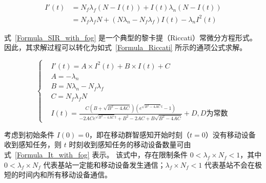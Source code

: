 
\begin{equation}
  \label{Formula_SIR_with_fog}
  \begin{aligned}
    I'(t) &= N_f \lambda_f (N-I(t)) + I(t) \lambda_n (N-I(t)) \\
    &= N_f \lambda_f N + ( N \lambda_n - N_f \lambda_f) I(t) - \lambda_n I^2(t) 
  \end{aligned}
\end{equation}

式~\eqref{Formula_SIR_with_fog} 是一个典型的黎卡提（Riccati）常微分方程形式。
因此，其求解过程可以转化为如式~\eqref{Formula_Riccati} 所示的通项公式求解。

\vspace{-1em}
\begin{equation}
  \label{Formula_Riccati}
  \left\{
    \begin{aligned}
      &I'(t) = A \times I^2(t) + B \times I(t) + C \\
      &A = -\lambda_n \\
      &B = N \lambda_n - N_f \lambda_f \\
      &C = N_f \lambda_f N \\
      &I(t) = \frac{C(B+\sqrt{B^2 - 4AC})(e^{\sqrt{B^2 - 4AC} t} - 1)}{-2ACe^{\sqrt{B^2 - 4AC} t} + B^2 -2AC + B \sqrt{B^2 - 4AC}} + D, D 为常数
    \end{aligned}
  \right.
\end{equation}

考虑到初始条件 $I(0)=0$，即在移动群智感知开始时刻（$t=0$）没有移动设备收到感知任务，则 $t$ 时刻收到感知任务的移动设备数量可由式~\eqref{Formula_It_with_fog} 表示。
该式中，存在限制条件 $0 < \lambda_f \times N_f < 1$，其中 $0 < \lambda_f \times N_f$ 代表基站一定能和移动设备发生通信；$\lambda_f \times N_f < 1$ 代表基站不会在极短的时间内和所有移动设备通信。

